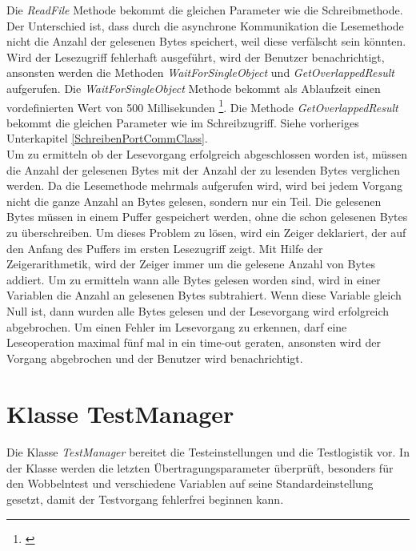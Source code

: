 Die \textit{ReadFile} Methode bekommt die gleichen Parameter wie die Schreibmethode. Der Unterschied ist, dass durch die asynchrone Kommunikation die Lesemethode nicht die Anzahl der gelesenen Bytes speichert, weil diese verfälscht sein könnten. Wird der Lesezugriff fehlerhaft ausgeführt, wird der Benutzer benachrichtigt, ansonsten werden die Methoden \textit{WaitForSingleObject} und \textit{GetOverlappedResult} aufgerufen. Die \textit{WaitForSingleObject} Methode bekommt als Ablaufzeit einen vordefinierten Wert von 500 Millisekunden \footnote{\cite{SerialCommunications}}. Die Methode \textit{GetOverlappedResult} bekommt die gleichen Parameter wie im Schreibzugriff. Siehe vorheriges Unterkapitel \ref{SchreibenPortCommClass}. \\

Um zu ermitteln ob der Lesevorgang erfolgreich abgeschlossen worden ist, müssen die Anzahl der gelesenen Bytes mit der Anzahl der zu lesenden Bytes verglichen werden. Da die Lesemethode mehrmals aufgerufen wird, wird bei jedem Vorgang nicht die ganze Anzahl an Bytes gelesen, sondern nur ein Teil. Die gelesenen Bytes müssen in einem Puffer gespeichert werden, ohne die schon gelesenen Bytes zu überschreiben. Um dieses Problem zu lösen, wird ein Zeiger deklariert, der auf den Anfang des Puffers im ersten Lesezugriff zeigt. Mit Hilfe der Zeigerarithmetik, wird der Zeiger immer um die gelesene Anzahl von Bytes addiert. Um zu ermitteln wann alle Bytes gelesen worden sind, wird in einer Variablen die Anzahl an gelesenen Bytes subtrahiert. Wenn diese Variable gleich Null ist, dann wurden alle Bytes gelesen und der Lesevorgang wird erfolgreich abgebrochen. Um einen Fehler im Lesevorgang zu erkennen, darf eine Leseoperation maximal fünf mal in ein time-out geraten, ansonsten wird der Vorgang abgebrochen und der Benutzer wird benachrichtigt.



\newpage


\section{Klasse TestManager}
\paragraph{}
Die Klasse \textit{TestManager} bereitet die Testeinstellungen und die Testlogistik vor. In der Klasse werden die letzten Übertragungsparameter überprüft, besonders für den Wobbelntest und verschiedene Variablen auf seine Standardeinstellung gesetzt, damit der Testvorgang fehlerfrei beginnen kann.


